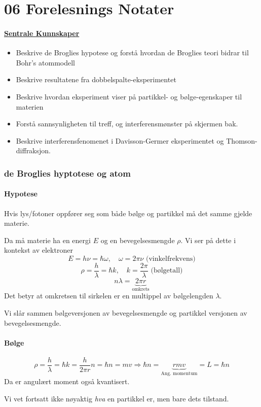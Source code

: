 \section{06 Forelesnings Notater}
\paragraph{\underline{Sentrale Kunnskaper}}
\begin{itemize}
    \item Beskrive de Broglies hypotese og forstå hvordan de Broglies teori bidrar til Bohr's atommodell
    \item Beskrive resultatene fra dobbelspalte-eksperimentet 
    \item Beskrive hvordan eksperiment viser på partikkel- og bølge-egenskaper til materien
    \item Forstå sannsynligheten til treff, og interferensmønster på skjermen bak. 
    \item Beskrive interferensfenomenet i Davisson-Germer eksperimentet og Thomson-diffraksjon. 
\end{itemize}

\subsubsection{de Broglies hyptotese og atom}
\paragraph{Hypotese}
Hvis lys/fotoner oppfører seg som både bølge og partikkel må det samme gjelde materie. 

Da må materie ha en energi $E$ og en bevegelsesmengde $ρ$. Vi ser på dette i kontekst av elektroner 
\[
E = hν = ℏω, \quad ω = 2πν \text{ (vinkelfrekvens)}
\]
\[
ρ = \frac{h}{λ} = ℏk, \quad k = \frac{2π}{λ} \text{ (bølgetall)} 
\]
\[
nλ  = \underbrace{2πr}_{\text{omkrets}} 
\]
Det betyr at omkretsen til sirkelen er en multippel av bølgelengden $λ$. 

Vi slår sammen bølgeversjonen av bevegelsesmengde og partikkel versjonen av bevegelsesmengde.
\paragraph{Bølge} 
\[
ρ = \frac{h}{λ} = ℏk = \frac{h}{2πr}n = ℏn = mv ⇒ ℏn = \underbrace{rmv}_{\text{Ang. momentum}} = L = ℏn
\]
Da er angulært moment også kvantisert. 

Vi vet fortsatt ikke nøyaktig \textit{hva} en partikkel er, men bare dets tilstand. 


